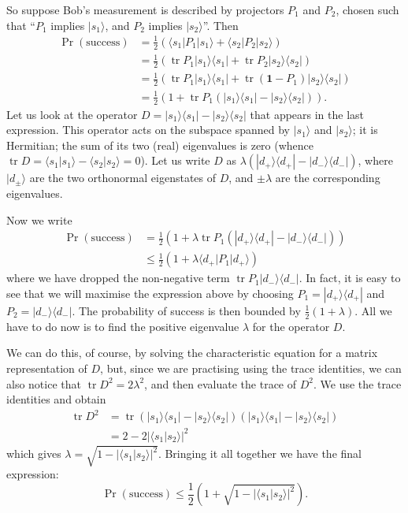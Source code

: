 \documentclass[fleqn]{article}
\begin{document}
So suppose Bob's measurement is described by projectors \(P_1\) and \(P_2\), chosen such that ``\(P_1\) implies \(|s_1\rangle\), and \(P_2\) implies \(|s_2\rangle\)''.
Then
\[
  \begin{aligned}
    \Pr(\text{success})
    &= \frac{1}{2}\left(
        \langle s_1|P_1|s_1\rangle + \langle s_2|P_2|s_2\rangle
      \right)
  \\&= \frac{1}{2}\left(
        \operatorname{tr}P_1|s_1\rangle\langle s_1| + \operatorname{tr}P_2|s_2\rangle\langle s_2|
      \right)
  \\&= \frac{1}{2}\left(
        \operatorname{tr}P_1|s_1\rangle\langle s_1| + \operatorname{tr}(\mathbf{1}-P_1)|s_2\rangle\langle s_2|
      \right)
  \\&= \frac{1}{2}\left(
        1 + \operatorname{tr}P_1\left( |s_1\rangle\langle s_1| - |s_2\rangle\langle s_2| \right)
      \right).
\end{aligned}
\]
Let us look at the operator \(D = |s_1\rangle\langle s_1| - |s_2\rangle\langle s_2|\) that appears in the last expression.
This operator acts on the subspace spanned by \(|s_1\rangle\) and \(|s_2\rangle\); it is Hermitian; the sum of its two (real) eigenvalues is zero (whence \(\operatorname{tr}D=\langle s_1|s_1\rangle-\langle s_2|s_2\rangle=0\)).
Let us write \(D\) as \(\lambda(|d_+\rangle\langle d_+| - |d_-\rangle\langle d_-|)\), where \(|d_\pm\rangle\) are the two orthonormal eigenstates of \(D\), and \(\pm\lambda\) are the corresponding eigenvalues.

Now we write
\[
\begin{aligned}
  \Pr (\text{success})
  &= \frac{1}{2}\left(
      1 + \lambda\operatorname{tr}P_1\left( |d_+\rangle\langle d_+|-|d_-\rangle\langle d_-| \right)
    \right)
\\&\leqslant\frac{1}{2}\left(
      1+\lambda \langle d_+|P_1|d_+\rangle
    \right)
\end{aligned}
\]
where we have dropped the non-negative term \(\operatorname{tr}P_1|d_-\rangle\langle d_-|\).
In fact, it is easy to see that we will maximise the expression above by choosing \(P_1 = |d_+\rangle\langle d_+|\) and \(P_2 = |d_-\rangle\langle d_-|\).
The probability of success is then bounded by \(\frac{1}{2}(1+\lambda)\).
All we have to do now is to find the positive eigenvalue \(\lambda\) for the operator \(D\).

We can do this, of course, by solving the characteristic equation for a matrix representation of \(D\), but, since we are practising using the trace identities, we can also notice that \(\operatorname{tr}D^2 = 2\lambda^2\), and then evaluate the trace of \(D^2\).
We use the trace identities and obtain
\[
  \begin{aligned}
    \operatorname{tr}D^2
    &= \operatorname{tr}\left( |s_1\rangle\langle s_1|-|s_2\rangle\langle s_2| \right) \left( |s_1\rangle\langle s_1|-|s_2\rangle\langle s_2| \right)
  \\&= 2-2|\langle s_1|s_2\rangle|^2
  \end{aligned}
\]
which gives \(\lambda = \sqrt{1-|\langle s_1|s_2\rangle|^2}\).
Bringing it all together we have the final expression:
\[
 \Pr (\text{success})
 \leqslant\frac{1}{2}\left( 1+ \sqrt{1-|\langle s_1|s_2\rangle|^2} \right).
\]
\end{document}
